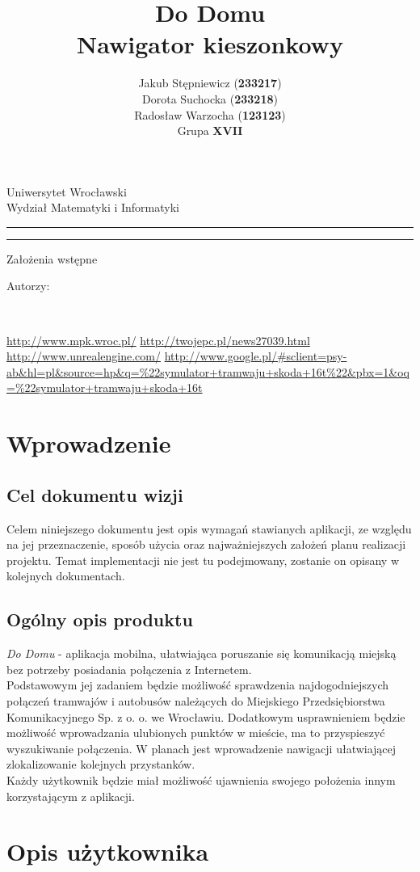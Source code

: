 \documentclass[12pt,a4paper]{article}
\author{Jakub Stępniewicz (\textbf{233217})\\Dorota Suchocka (\textbf{233218})\\Radosław Warzocha (\textbf{123123})
\\Grupa {\bf XVII}}
\title{Do Domu\\ \small{Nawigator kieszonkowy}}
\makeatletter
\newcommand{\linia}{\rule{\linewidth}{0.4mm}}
\renewcommand{\maketitle}{\begin{titlepage}
		\vspace*{1cm}
    \begin{center}\small
    	Uniwersytet Wrocławski\\
    	Wydział Matematyki i Informatyki\\
    \end{center}
    \vspace{3cm}
    \noindent
    \linia
    \begin{center}
    	\LARGE{\textsc{\@title}}
         \end{center}
     \linia
    \begin{center}
    	\Large{Założenia wstępne}
         \end{center}
    \vspace{0.5cm}

    \begin{flushright}

    \begin{minipage}{5.5cm}

    	\small Autorzy:

    \normalsize {\@author} \par
    

    \end{minipage}
    \vspace{5cm}

     

     \end{flushright}

    \vspace*{\stretch{6}}

    \begin{center}

    \@date\\

    \end{center}

  \end{titlepage}%

}
\makeatother
\begin{document}
\maketitle
\tableofcontents
\vspace{5cm}
	\begin{thebibliography}{9}
	 \url{http://www.mpk.wroc.pl/}
	 \url{http://twojepc.pl/news27039.html}
	 \url{http://www.unrealengine.com/}
	 \url{http://www.google.pl/#sclient=psy-ab&hl=pl&source=hp&q=%22symulator+tramwaju+skoda+16t%22&pbx=1&oq=%22symulator+tramwaju+skoda+16t}
	\end{thebibliography}
\newpage
% 
\section{Wprowadzenie}
	\subsection{Cel dokumentu wizji}
	Celem niniejszego dokumentu jest opis wymagań stawianych aplikacji, ze względu na jej przeznaczenie, sposób użycia oraz najważniejszych założeń planu realizacji projektu. Temat implementacji nie jest tu podejmowany, zostanie on opisany w kolejnych dokumentach.
	
	\subsection{Ogólny opis produktu} 
	\textit{Do Domu} - aplikacja mobilna, ułatwiająca poruszanie się komunikacją miejską bez potrzeby posiadania połączenia z Internetem. \\ 

Podstawowym jej zadaniem będzie możliwość sprawdzenia najdogodniejszych połączeń tramwajów i autobusów należących do Miejskiego Przedsiębiorstwa Komunikacyjnego Sp. z o. o. we Wrocławiu. Dodatkowym usprawnieniem będzie możliwość wprowadzania ulubionych punktów w mieście, ma to przyspieszyć wyszukiwanie połączenia. W planach jest wprowadzenie nawigacji ułatwiającej zlokalizowanie kolejnych przystanków. \\ 

Każdy użytkownik będzie miał możliwość ujawnienia swojego położenia innym korzystającym z aplikacji.
	\newpage
	
\section{Opis użytkownika}
\end{document}
